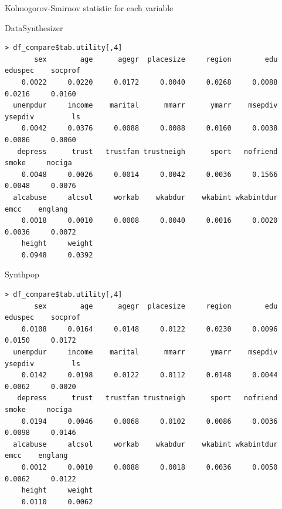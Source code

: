 \documentclass[xcolor=table]{beamer}
\begin{document}
\begin{frame}[fragile]{Kolmogorov-Smirnov statistic for each variable}

DataSynthesizer
\begin{lstlisting}[firstnumber=1, label=glabels, xleftmargin=10pt,frame=single] 
> df_compare$tab.utility[,4]
       sex        age      agegr  placesize     region        edu    eduspec    socprof 
    0.0022     0.0220     0.0172     0.0040     0.0268     0.0088     0.0216     0.0160 
  unempdur     income    marital      mmarr      ymarr    msepdiv    ysepdiv         ls 
    0.0042     0.0376     0.0088     0.0088     0.0160     0.0038     0.0086     0.0060 
   depress      trust   trustfam trustneigh      sport   nofriend      smoke     nociga 
    0.0048     0.0026     0.0014     0.0042     0.0036     0.1566     0.0048     0.0076 
  alcabuse     alcsol     workab    wkabdur    wkabint wkabintdur       emcc    englang 
    0.0018     0.0010     0.0008     0.0040     0.0016     0.0020     0.0036     0.0072 
    height     weight 
    0.0948     0.0392
\end{lstlisting}
Synthpop
\begin{lstlisting}[firstnumber=1, label=glabels, xleftmargin=10pt,frame=single] 
> df_compare$tab.utility[,4]
       sex        age      agegr  placesize     region        edu    eduspec    socprof 
    0.0108     0.0164     0.0148     0.0122     0.0230     0.0096     0.0150     0.0172 
  unempdur     income    marital      mmarr      ymarr    msepdiv    ysepdiv         ls 
    0.0142     0.0198     0.0122     0.0112     0.0148     0.0044     0.0062     0.0020 
   depress      trust   trustfam trustneigh      sport   nofriend      smoke     nociga 
    0.0194     0.0046     0.0068     0.0102     0.0086     0.0036     0.0098     0.0146 
  alcabuse     alcsol     workab    wkabdur    wkabint wkabintdur       emcc    englang 
    0.0012     0.0010     0.0088     0.0018     0.0036     0.0050     0.0062     0.0122 
    height     weight 
    0.0110     0.0062 
\end{lstlisting}

\end{frame}


\end{document}
